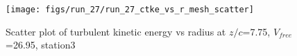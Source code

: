 \begin{figure}[H]
\centering
\texttt{[image: figs/run\_27/run\_27\_ctke\_vs\_r\_mesh\_scatter]}
\caption{Scatter plot of turbulent kinetic energy vs radius at $z/c$=7.75, $V_{free}$=26.95, station3}
\label{fig:run_27_ctke_vs_r_mesh_scatter}
\end{figure}


